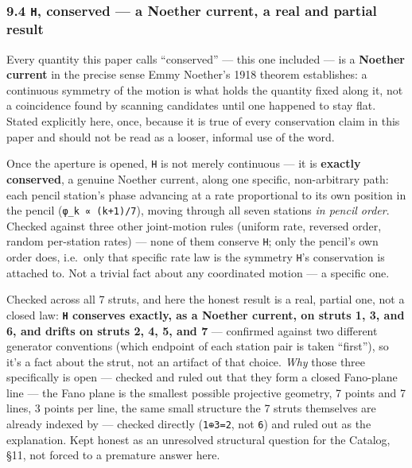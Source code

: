\documentclass[
  10pt,
]{article}
\begin{document}
\hypertarget{h-conserved-a-noether-current-a-real-and-partial-result}{%
\subsubsection{\texorpdfstring{9.4 \texttt{H}, conserved --- a Noether
current, a real and partial
result}{9.4 H, conserved --- a Noether current, a real and partial result}}\label{h-conserved-a-noether-current-a-real-and-partial-result}}

Every quantity this paper calls ``conserved'' --- this one included ---
is a \textbf{Noether current} in the precise sense Emmy Noether's 1918
theorem establishes: a continuous symmetry of the motion is what holds
the quantity fixed along it, not a coincidence found by scanning
candidates until one happened to stay flat. Stated explicitly here,
once, because it is true of every conservation claim in this paper and
should not be read as a looser, informal use of the word.

Once the aperture is opened, \texttt{H} is not merely continuous --- it
is \textbf{exactly conserved}, a genuine Noether current, along one
specific, non-arbitrary path: each pencil station's phase advancing at a
rate proportional to its own position in the pencil
(\texttt{φ\_k\ ∝\ (k+1)/7}), moving through all seven stations \emph{in
pencil order}. Checked against three other joint-motion rules (uniform
rate, reversed order, random per-station rates) --- none of them
conserve \texttt{H}; only the pencil's own order does, i.e.~only that
specific rate law is the symmetry \texttt{H}'s conservation is attached
to. Not a trivial fact about any coordinated motion --- a specific one.

Checked across all 7 struts, and here the honest result is a real,
partial one, not a closed law: \textbf{\texttt{H} conserves exactly, as
a Noether current, on struts 1, 3, and 6, and drifts on struts 2, 4, 5,
and 7} --- confirmed against two different generator conventions (which
endpoint of each station pair is taken ``first''), so it's a fact about
the strut, not an artifact of that choice. \emph{Why} those three
specifically is open --- checked and ruled out that they form a closed
Fano-plane line --- the Fano plane is the smallest possible projective
geometry, 7 points and 7 lines, 3 points per line, the same small
structure the 7 struts themselves are already indexed by --- checked
directly (\texttt{1⊕3=2}, not \texttt{6}) and ruled out as the
explanation. Kept honest as an unresolved structural question for the
Catalog, §11, not forced to a premature answer here.
\end{document}

